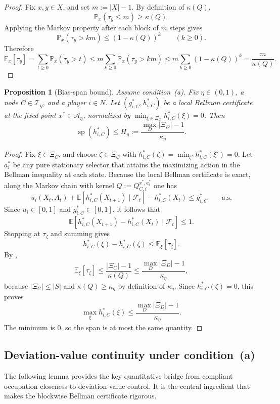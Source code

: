 \documentclass[12pt]{article}
\newtheorem{proposition}[theorem]{Proposition}
\theoremstyle{definition}
\newcommand{\E}{\mathbb{E}}
\newcommand{\Pb}{\mathbb{P}}
\newcommand{\1}{\mathbf{1}}
\newcommand{\cA}{\mathcal{A}}
\newcommand{\cT}{\mathcal{T}}
\DeclareMathOperator{\spn}{sp}
\begin{document}
\begin{proof}
Fix \(x,y\in X\), and set \(m:=|X|-1\).  By definition of \(\kappa(Q)\),
\[
\Pb_x(\tau_y\le m)\ge \kappa(Q).
\]
Applying the Markov property after each block of \(m\) steps gives
\[
\Pb_x(\tau_y>km)\le (1-\kappa(Q))^k
\qquad (k\ge 0).
\]
Therefore
\[
\E_x[\tau_y]
=
\sum_{t\ge 0}\Pb_x(\tau_y>t)
\le
m\sum_{k\ge 0}\Pb_x(\tau_y>km)
\le
m\sum_{k\ge 0}(1-\kappa(Q))^k
=
\frac{m}{\kappa(Q)}.
\]
\end{proof}

\begin{proposition}[Bias-span bound]
\label{prop:bias-span}
Assume condition~\textnormal{(a)}.  Fix \(\eta\in(0,1)\), a node \(C\in \cT_\eta\), and a
player \(i\in N\).  Let \((g_{i,C}^*,h_{i,C}^*)\) be a local Bellman certificate at the
fixed point \(x^*\in \cA_\eta\), normalized by
\(\min_{\xi\in \Xi_C} h_{i,C}^*(\xi)=0\).  Then
\[
\spn(h_{i,C}^*)
\le
H_\eta
:=
\frac{\max_D|\Xi_D|-1}{\kappa_\eta}.
\]
\end{proposition}

\begin{proof}
Fix \(\xi\in \Xi_C\), and choose \(\zeta\in \Xi_C\) with
\(h_{i,C}^*(\zeta)=\min_{\xi'} h_{i,C}^*(\xi')=0\).  Let \(a_i^*\) be any pure stationary
selector that attains the maximizing action in the Bellman inequality at each state.
Because the local Bellman certificate is exact, along the Markov chain with kernel
\(Q:=Q_{C,i}^{x^*,a_i^*}\) one has
\[
u_i(X_t,A_t)+\E[h_{i,C}^*(X_{t+1})\mid \mathcal F_t]-h_{i,C}^*(X_t)\le g_{i,C}^*
\qquad\text{a.s.}
\]
Since \(u_i\in[0,1]\) and \(g_{i,C}^*\in[0,1]\), it follows that
\[
\E[h_{i,C}^*(X_{t+1})-h_{i,C}^*(X_t)\mid \mathcal F_t]\le 1.
\]
Stopping at \(\tau_\zeta\) and summing gives
\[
h_{i,C}^*(\xi)-h_{i,C}^*(\zeta)\le \E_\xi[\tau_\zeta].
\]
By ,
\[
\E_\xi[\tau_\zeta]\le \frac{|\Xi_C|-1}{\kappa(Q)}\le \frac{\max_D|\Xi_D|-1}{\kappa_\eta},
\]
because \(|\Xi_C|\le |S|\) and \(\kappa(Q)\ge \kappa_\eta\) by definition of \(\kappa_\eta\).
Since \(h_{i,C}^*(\zeta)=0\), this proves
\[
\max_{\xi} h_{i,C}^*(\xi)\le \frac{\max_D|\Xi_D|-1}{\kappa_\eta}.
\]
The minimum is \(0\), so the span is at most the same quantity.
\end{proof}

\subsection{Deviation-value continuity under condition~(a)}

The following lemma provides the key quantitative bridge from compliant occupation closeness to deviation-value control. It is the central ingredient that makes the blockwise Bellman certificate rigorous.
\end{document}
